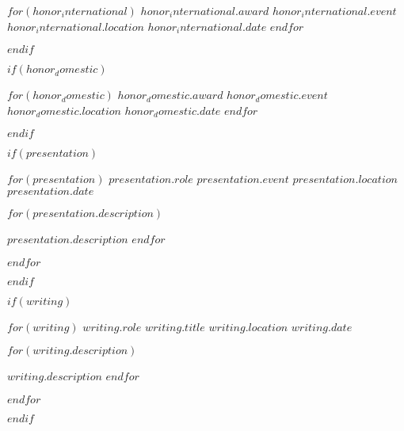 \documentclass[11pt, a4paper]{awesome-cv}
\begin{document}
    \begin{cvhonors}
        $for(honor_international)$
        \cvhonor
        {$honor_international.award$} %
        {$honor_international.event$} %
        {$honor_international.location$} %
        {$honor_international.date$} %
        {}
        $endfor$
    \end{cvhonors}
    $endif$

    $if(honor_domestic)$

    \begin{cvhonors}
        $for(honor_domestic)$
        \cvhonor
        {$honor_domestic.award$} %
        {$honor_domestic.event$} %
        {$honor_domestic.location$} %
        {$honor_domestic.date$} %
        {}
        $endfor$
    \end{cvhonors}
    $endif$


    $if(presentation)$

    \begin{cventries}
        $for(presentation)$
        \cventry
        {$presentation.role$} %
        {$presentation.event$} %
        {$presentation.location$} %
        {$presentation.date$} %
        {
        \begin{cvitems}
            $for(presentation.description)$
            \item {$presentation.description$}
            $endfor$
        \end{cvitems}
        }
        $endfor$
    \end{cventries}
    $endif$


    $if(writing)$

    \begin{cventries}
        $for(writing)$
        \cventry
        {$writing.role$} %
        {$writing.title$} %
        {$writing.location$} %
        {$writing.date$} %
        {
        \begin{cvitems}
            $for(writing.description)$
            \item {$writing.description$}
            $endfor$
        \end{cvitems}
        }
        $endfor$
    \end{cventries}
    $endif$
\end{document}
